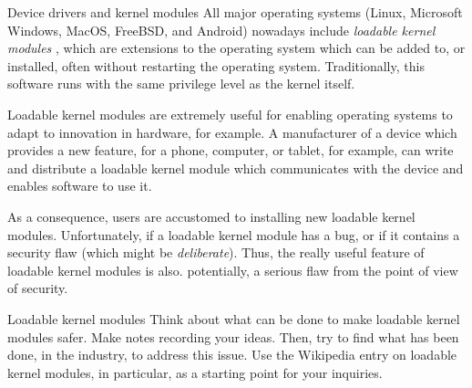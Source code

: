 \begin{example}{Device drivers and kernel modules}\label{kernelmodulesexample}%
All major operating systems (Linux, Microsoft Windows, MacOS, FreeBSD, and Android)
nowadays include {\em loadable kernel modules} \cite{loadableKernelModules}, 
which are extensions to the operating system
which can be added to, or installed, often without restarting the operating system.
Traditionally, this software runs with the same privilege level as the kernel itself.

Loadable kernel modules are extremely useful for enabling operating systems to adapt
to innovation in hardware, for example. A manufacturer of a device which provides a new
feature, for a phone, computer, or tablet, for example, can write and distribute a 
loadable kernel module which communicates with the device and enables software to use
it.

As a consequence, users are accustomed to installing new loadable kernel modules. Unfortunately,
if a loadable kernel module has a bug, or if it contains a security flaw (which might
be {\em deliberate}). Thus, the really useful feature of loadable kernel modules is
also. potentially, a serious flaw from the point of view of security.
\end{example}

\begin{exercise}{Loadable kernel modules}\label{loadableKernelModulesExz}%
Think about what can be done to make loadable kernel modules safer. Make notes
recording your ideas. Then, try to find what has been done, in the industry, to address
this issue. Use the Wikipedia entry \cite{loadableKernelModules} on loadable kernel 
modules, in particular, as a starting point for your inquiries.
\end{exercise}

